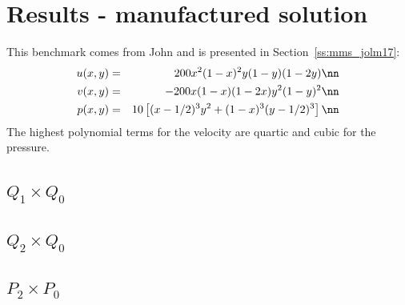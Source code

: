 \newpage
\section*{Results - \textcite{jolm17} manufactured solution}

This benchmark comes from John \etal \cite{jolm17} and is presented in Section~\ref{ss:mms_jolm17}:
\begin{eqnarray}
u(x,y) &=& 200x^2(1-x)^2y(1-y)(1-2y) \nn\\
v(x,y) &=& -200x(1-x)(1-2x)y^2(1-y)^2 \nn\\
p(x,y) &=& 10\left[(x-1/2)^3y^2+(1-x)^3(y-1/2)^3 \right] \nn
\end{eqnarray}
The highest polynomial terms for the velocity are quartic and cubic for the pressure.



\subsection*{$Q_1\times Q_0$}

\subsection*{$Q_2\times Q_0$}

\subsection*{$P_2\times P_0$}

